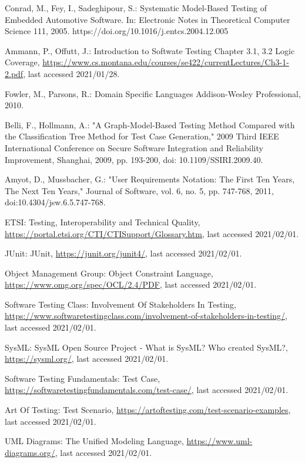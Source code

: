 \documentclass[a4paper,10pt, bibliography=totocnumbered]{scrreprt}
\begin{document}
\begin{thebibliography}{9}
 Conrad, M., Fey, I., Sadeghipour, S.: Systematic Model-Based Testing of Embedded Automotive Software. 
In: Electronic Notes in Theoretical Computer Science 111, 2005.
https://doi.org/10.1016/j.entcs.2004.12.005

 Ammann, P., Offutt, J.: Introduction to Softwate Testing Chapter 3.1, 3.2 Logic Coverage, \url{https://www.cs.montana.edu/courses/se422/currentLectures/Ch3-1-2.pdf}, last accessed 2021/01/28.

 Fowler, M., Parsons, R.: Domain Specific Languages
Addison-Wesley Professional, 2010.

 Belli, F., Hollmann, A.: "A Graph-Model-Based Testing Method Compared with the Classification Tree Method for Test Case Generation," 2009 Third IEEE International Conference on Secure Software Integration and Reliability Improvement, Shanghai, 2009, pp. 193-200, doi: 10.1109/SSIRI.2009.40.

 Amyot, D., Mussbacher, G.: "User Requirements Notation: The First Ten Years, The Next Ten Years," Journal of Software, vol. 6, no. 5, pp. 747-768, 2011, doi:10.4304/jsw.6.5.747-768.

 ETSI: Testing, Interoperability and Technical Quality, \url{https://portal.etsi.org/CTI/CTISupport/Glossary.htm}, last accessed 2021/02/01.

 JUnit: JUnit, \url{https://junit.org/junit4/}, last accessed 2021/02/01.

 Object Management Group: Object Constraint Language, \url{https://www.omg.org/spec/OCL/2.4/PDF}, last accessed 2021/02/01.

 Software Testing Class: Involvement Of Stakeholders In Testing, \url{https://www.softwaretestingclass.com/involvement-of-stakeholders-in-testing/}, last accessed 2021/02/01.

 SysML: SysML Open Source Project - What is SysML? Who created SysML?, \url{https://sysml.org/}, last accessed 2021/02/01.

 Software Testing Fundamentals: Test Case, \url{https://softwaretestingfundamentals.com/test-case/}, last accessed 2021/02/01.

 Art Of Testing: Test Scenario, \url{https://artoftesting.com/test-scenario-examples}, last accessed 2021/02/01.

 UML Diagrams: The Unified Modeling Language, \url{https://www.uml-diagrams.org/}, last accessed 2021/02/01.



\end{thebibliography}
\end{document}
